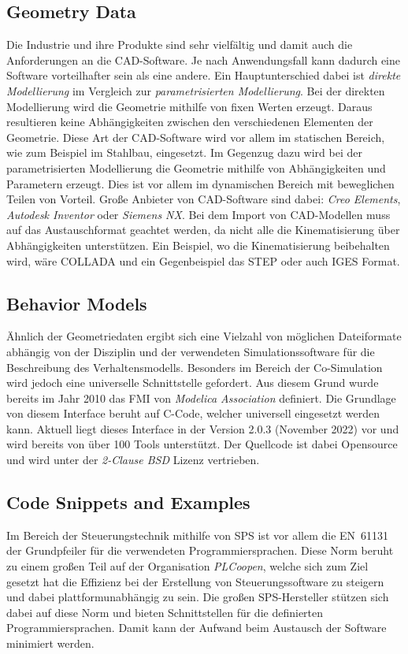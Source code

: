 \subsection{Geometry Data}		%
	Die Industrie und ihre Produkte sind sehr vielfältig und damit auch die Anforderungen an die CAD-Software. Je nach Anwendungsfall kann dadurch eine Software vorteilhafter sein als eine andere. Ein Hauptunterschied dabei ist \textit{direkte Modellierung} im Vergleich zur \textit{parametrisierten Modellierung}. 
	Bei der direkten Modellierung wird die Geometrie mithilfe von fixen Werten erzeugt. Daraus resultieren keine Abhängigkeiten zwischen den verschiedenen Elementen der Geometrie. Diese Art der CAD-Software wird vor allem im statischen Bereich, wie zum Beispiel im Stahlbau, eingesetzt.
	Im Gegenzug dazu wird bei der parametrisierten Modellierung die Geometrie mithilfe von Abhängigkeiten und Parametern erzeugt. Dies ist vor allem im dynamischen Bereich mit beweglichen Teilen von Vorteil. 
	Große Anbieter von CAD-Software sind dabei: \textit{Creo Elements}, \textit{Autodesk Inventor} oder \textit{Siemens NX}. 
	Bei dem Import von CAD-Modellen muss auf das Austauschformat geachtet werden, da nicht alle die Kinematisierung über Abhängigkeiten unterstützen. Ein Beispiel, wo die Kinematisierung beibehalten wird, wäre \ac{COLLADA} und ein Gegenbeispiel das \ac{STEP} oder auch \ac{IGES} Format.

\subsection{Behavior Models}	%
	Ähnlich der Geometriedaten ergibt sich eine Vielzahl von möglichen Dateiformate abhängig von der Disziplin und der verwendeten Simulationssoftware für die Beschreibung des Verhaltensmodells. Besonders im Bereich der Co-Simulation wird jedoch eine universelle Schnittstelle gefordert. Aus diesem Grund wurde bereits im Jahr 2010 das \ac{FMI} von \textit{Modelica Association} definiert. Die Grundlage von diesem Interface beruht auf C-Code, welcher universell eingesetzt werden kann. Aktuell liegt dieses Interface in der Version 2.0.3 (November 2022) vor und wird bereits von über 100 Tools unterstützt. Der Quellcode ist dabei Opensource und wird unter der \textit{2-Clause BSD} Lizenz vertrieben.  

\subsection{Code Snippets and Examples}		%
	Im Bereich der Steuerungstechnik mithilfe von SPS ist vor allem die EN~61131 der Grundpfeiler für die verwendeten Programmiersprachen. Diese Norm beruht zu einem großen Teil auf der Organisation \textit{PLCoopen}, welche sich zum Ziel gesetzt hat die Effizienz bei der Erstellung von Steuerungssoftware zu steigern und dabei plattformunabhängig zu sein. Die großen SPS-Hersteller stützen sich dabei auf diese Norm und bieten Schnittstellen für die definierten Programmiersprachen. Damit kann der Aufwand beim Austausch der Software minimiert werden. 


